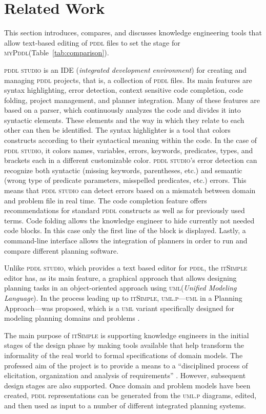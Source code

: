 \documentclass[runningheads]{llncs}
\newcommand{\mypddl}{\textsc{myPddl}\xspace}
\newcommand{\pddlstudio}{\textsc{pddl studio}\xspace}
\newcommand{\itsimple}{\textsc{itSimple}\xspace}
\newcommand{\pddl}{\textsc{pddl}\xspace}
\newcommand{\uml}{\textsc{uml}\xspace}
\begin{document}
\section{Related Work}
\label{sec:related-work}

This section introduces, compares, and discusses knowledge engineering
tools that allow text-based editing of \textsc{pddl} files to set the
stage for \mypddl (Table~\ref{tab:comparison}).

\pddlstudio \cite{plch2012inspect} is an IDE (\emph{integrated
  development environment}) for creating and managing \textsc{pddl}
projects, that is, a collection of \textsc{pddl} files. Its main
features are syntax highlighting, error detection, context sensitive
code completion, code folding, project management, and planner
integration. Many of these features are based on a parser, which
continuously analyzes the code and divides it into syntactic
elements. These elements and the way in which they relate to each
other can then be identified. The syntax highlighter is a tool that
colors constructs according to their syntactical meaning within the
code. In the case of \pddlstudio, it colors names, variables, errors,
keywords, predicates, types, and brackets each in a different
customizable color.  \pddlstudio's error detection can recognize both
syntactic (missing keywords, parentheses, etc.) and semantic (wrong
type of predicate parameters, misspelled predicates, etc.)
errors. This means that \pddlstudio can detect errors based on a
mismatch between domain and problem file in real time. The code
completion feature offers recommendations for standard \textsc{pddl}
constructs as well as for previously used terms. Code folding allows
the knowledge engineer to hide currently not needed code blocks. In
this case only the first line of the block is displayed. Lastly, a
command-line interface allows the integration of planners in order to
run and compare different planning software.

Unlike \pddlstudio, which provides a text based editor for \pddl, the
\itsimple \cite{vaquero2005itsimple} editor has, as its main feature,
a graphical approach that allows designing planning tasks in an
object-oriented approach using \uml (\emph{Unified Modeling
  Language}). In the process leading up to \itsimple,
\textsc{uml.p}---\textsc{uml} in a Planning Approach---was proposed,
which is a \textsc{uml} variant specifically designed for modeling
planning domains and problems \cite{vaquero2006use}.

The main purpose of \itsimple is supporting knowledge engineers in the
initial stages of the design phase by making tools available that help
transform the informality of the real world to formal specifications
of domain models. The professed aim of the project is to provide a
means to a \enquote{disciplined process of elicitation, organization
  and analysis of requirements} \cite{vaquero2005itsimple}. However,
subsequent design stages are also supported. Once domain and problem
models have been created, \textsc{pddl} representations can be
generated from the \textsc{uml.p} diagrams, edited, and then used as
input to a number of different integrated planning systems.
\end{document}
